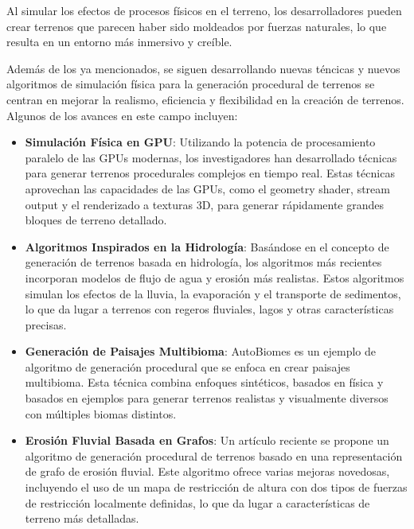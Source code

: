 Al simular los efectos de procesos físicos en el terreno, los desarrolladores pueden crear terrenos que parecen haber sido moldeados por fuerzas naturales, lo que resulta en un entorno más inmersivo y creíble. 

Además de los ya mencionados, se siguen desarrollando nuevas téncicas y nuevos algoritmos de simulación física para la generación procedural de terrenos se centran en mejorar la realismo, eficiencia y flexibilidad en la creación de terrenos. Algunos de los avances en este campo incluyen:

\begin{itemize}
    \item \textbf{Simulación Física en GPU}: Utilizando la potencia de procesamiento paralelo de las GPUs modernas, los investigadores han desarrollado técnicas para generar terrenos procedurales complejos en tiempo real. Estas técnicas aprovechan las capacidades de las GPUs, como el geometry shader, stream output y el renderizado a texturas 3D, para generar rápidamente grandes bloques de terreno detallado\cite{SimulacionFisicaGPU}.
    
    \item \textbf{Algoritmos Inspirados en la Hidrología}: Basándose en el concepto de generación de terrenos basada en hidrología, los algoritmos más recientes incorporan modelos de flujo de agua y erosión más realistas. Estos algoritmos simulan los efectos de la lluvia, la evaporación y el transporte de sedimentos, lo que da lugar a terrenos con regeros fluviales, lagos y otras características precisas\cite{AlgoritmosHidrologia}.
    
    \item \textbf{Generación de Paisajes Multibioma}: AutoBiomes es un ejemplo de algoritmo de generación procedural que se enfoca en crear paisajes multibioma. Esta técnica combina enfoques sintéticos, basados en física y basados en ejemplos para generar terrenos realistas y visualmente diversos con múltiples biomas distintos\cite{GeneracionMultiBioma}.
    
    \item \textbf{Erosión Fluvial Basada en Grafos}: Un artículo reciente se propone un algoritmo de generación procedural de terrenos basado en una representación de grafo de erosión fluvial. Este algoritmo ofrece varias mejoras novedosas, incluyendo el uso de un mapa de restricción de altura con dos tipos de fuerzas de restricción localmente definidas, lo que da lugar a características de terreno más detalladas\cite{VillaValdes2015}.
    
\end{itemize}



